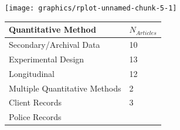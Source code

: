 \documentclass[]{tufte-handout}
\begin{document}
\texttt{[image: graphics/rplot-unnamed-chunk-5-1]}

\newpage


\begin{longtable}[]{@{}ll@{}}
\toprule
\begin{minipage}[b]{0.42\columnwidth}\raggedright\strut
Quantitative Method\strut
\end{minipage} & \begin{minipage}[b]{0.21\columnwidth}\raggedright\strut
\(N_{Articles}\)\strut
\end{minipage}\tabularnewline
\midrule
\endhead
\begin{minipage}[t]{0.42\columnwidth}\raggedright\strut
Secondary/Archival Data\strut
\end{minipage} & \begin{minipage}[t]{0.21\columnwidth}\raggedright\strut
10\strut
\end{minipage}\tabularnewline
\begin{minipage}[t]{0.42\columnwidth}\raggedright\strut
Experimental Design\strut
\end{minipage} & \begin{minipage}[t]{0.21\columnwidth}\raggedright\strut
13\strut
\end{minipage}\tabularnewline
\begin{minipage}[t]{0.42\columnwidth}\raggedright\strut
Longitudinal\strut
\end{minipage} & \begin{minipage}[t]{0.21\columnwidth}\raggedright\strut
12\strut
\end{minipage}\tabularnewline
\begin{minipage}[t]{0.42\columnwidth}\raggedright\strut
Multiple Quantitative Methods\strut
\end{minipage} & \begin{minipage}[t]{0.21\columnwidth}\raggedright\strut
2\strut
\end{minipage}\tabularnewline
\begin{minipage}[t]{0.42\columnwidth}\raggedright\strut
Client Records\strut
\end{minipage} & \begin{minipage}[t]{0.21\columnwidth}\raggedright\strut
3\strut
\end{minipage}\tabularnewline
\begin{minipage}[t]{0.42\columnwidth}\raggedright\strut
Police Records\strut
\end{minipage} & \begin{minipage}[t]{0.21\columnwidth}\raggedright\strut

\end{minipage}
\end{longtable}
\end{document}
